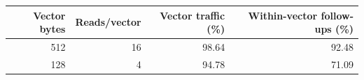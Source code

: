 \begin{tabular}{rrrr}
\toprule
Vector bytes & Reads/vector & Vector traffic (\%) & Within-vector follow-ups (\%) \\
\midrule
512 & 16 & 98.64 & 92.48 \\
128 & 4 & 94.78 & 71.09 \\
\bottomrule
\end{tabular}
